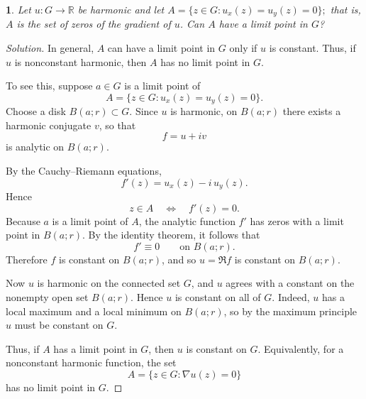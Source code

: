 \documentclass[12pt, a4paper]{report}
\theoremstyle{spaced}
\newtheorem{exercise}{}
\newcommand{\setexercise}[1]{\setcounter{exercise}{#1-1}}
\begin{document}
\setexercise{9}
\begin{exercise}
	Let $u:G\to\mathbb{R}$ be harmonic and let
	\(
	A=\{z\in G: u_x(z)=u_y(z)=0\};
	\)
	that is, $A$ is the set of zeros of the gradient of $u$. Can $A$ have a limit point in $G$?
\end{exercise}
\begin{proof}[Solution]
	In general, \(A\) can have a limit point in \(G\) only if \(u\) is constant. Thus, if \(u\) is nonconstant harmonic, then \(A\) has no limit point in \(G\).

	To see this, suppose \(a\in G\) is a limit point of
	\[
		A=\{z\in G: u_x(z)=u_y(z)=0\}.
	\]
	Choose a disk \(B(a;r)\subset G\). Since \(u\) is harmonic, on \(B(a;r)\) there exists a harmonic conjugate \(v\), so that
	\[
		f=u+iv
	\]
	is analytic on \(B(a;r)\).

	By the Cauchy--Riemann equations,
	\[
		f'(z)=u_x(z)-i\,u_y(z).
	\]
	Hence
	\[
		z\in A \quad \Longleftrightarrow \quad f'(z)=0.
	\]
	Because \(a\) is a limit point of \(A\), the analytic function \(f'\) has zeros with a limit point in \(B(a;r)\). By the identity theorem, it follows that
	\[
		f'\equiv 0 \qquad \text{on } B(a;r).
	\]
	Therefore \(f\) is constant on \(B(a;r)\), and so \(u=\Re f\) is constant on \(B(a;r)\).

	Now \(u\) is harmonic on the connected set \(G\), and \(u\) agrees with a constant on the nonempty open set \(B(a;r)\). Hence \(u\) is constant on all of \(G\). Indeed, \(u\) has a local maximum and a local minimum on \(B(a;r)\), so by the maximum principle \(u\) must be constant on \(G\).

	Thus, if \(A\) has a limit point in \(G\), then \(u\) is constant on \(G\). Equivalently, for a nonconstant harmonic function, the set
	\[
		A=\{z\in G: \nabla u(z)=0\}
	\]
	has no limit point in \(G\).
\end{proof}
\end{document}
